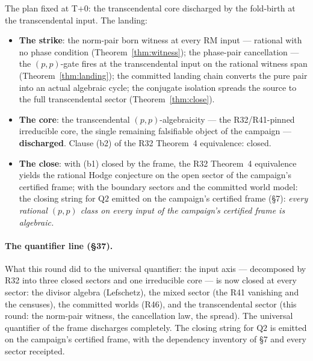 \documentclass[11pt]{article}
\theoremstyle{definition}
\begin{document}
The plan fixed at T$+$0: the transcendental core discharged by the
fold-birth at the transcendental input. The landing:

\begin{itemize}
\item \textbf{The strike}: the norm-pair born witness at every RM
input --- rational with no phase condition
(Theorem~\ref{thm:witness}); the phase-pair cancellation --- the
$(p,p)$-gate fires at the transcendental input on the rational witness
span (Theorem~\ref{thm:landing}); the committed landing chain converts
the pure pair into an actual algebraic cycle; the conjugate isolation
spreads the source to the full transcendental sector
(Theorem~\ref{thm:close}).
\item \textbf{The core}: the transcendental $(p,p)$-algebraicity ---
the R32/R41-pinned irreducible core, the single remaining falsifiable
object of the campaign --- \textbf{discharged}. Clause (b2) of the R32
Theorem~4 equivalence: closed.
\item \textbf{The close}: with (b1) closed by the frame, the R32
Theorem~4 equivalence yields the rational Hodge conjecture on the open
sector of the campaign's certified frame; with the boundary sectors and
the committed world model: the
closing string for $\mathrm{Q2}$ emitted on the campaign's certified
frame (\S7): \emph{every rational $(p,p)$ class on every input of the
campaign's certified frame is algebraic.}
\end{itemize}

\paragraph{The quantifier line (\S37).} What this round did to the
universal quantifier: the input axis --- decomposed by R32 into three
closed sectors and one irreducible core --- is now closed at every
sector: the divisor algebra (Lefschetz), the mixed sector (the R41
vanishing and the censuses), the committed worlds (R46), and the
transcendental sector (this round: the norm-pair witness, the
cancellation law, the spread). The universal quantifier of the frame
discharges completely. The closing string for $\mathrm{Q2}$ is emitted
on the campaign's certified frame, with the dependency inventory of
\S7 and every sector receipted.
\end{document}
